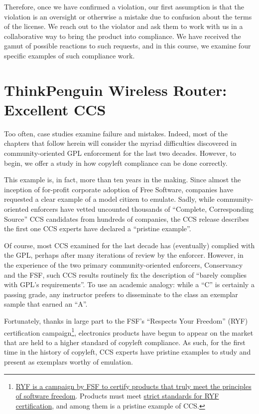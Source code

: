 Therefore, once we have confirmed a violation, our first assumption is
that the violation is an oversight or otherwise a mistake due to confusion
about the terms of the license. We reach out to the violator and ask them
to work with us in a collaborative way to bring the product into
compliance. We have received the gamut of possible reactions to such
requests, and in this course, we examine four specific examples of such
compliance work.

\chapter{ThinkPenguin Wireless Router: Excellent CCS}

Too often, case studies examine failure and mistakes.  Indeed, most of the
chapters that follow herein will consider the myriad difficulties discovered
in community-oriented GPL enforcement for the last two decades.  However, to
begin, we offer a study in how copyleft compliance can be done correctly.

This example is, in fact, more than ten years in the making.  Since almost
the inception of for-profit corporate adoption of Free Software, companies
have requested a clear example of a model citizen to emulate.  Sadly, while
community-oriented enforcers have vetted uncounted thousands of ``Complete,
Corresponding Source'' CCS candidates from hundreds of companies, the CCS
release describes the first one CCS experts have declared a ``pristine
example''.


Of course, most CCS examined for the last decade has (eventually) complied
with the GPL, perhaps after many iterations of review by the enforcer.
However, in the experience of the two primary community-oriented enforcers,
Conservancy and the FSF, such CCS results routinely fix the description of
``barely complies with GPL's requirements''.  To use an academic analogy:
while a ``C'' is certainly a passing grade, any instructor prefers to
disseminate to the class an exemplar sample that earned an ``A''.

Fortunately, thanks in large part to the FSF's
``Respects Your Freedom'' (RYF) certification campaign\footnote{\href{http://www.fsf.org/resources/hw/endorsement/respects-your-freedom}{RYF is
    a campaign by FSF to certify products that truly meet the principles of
    software freedom}.  Products must meet
  \href{http://www.fsf.org/resources/hw/endorsement/criteria}{strict
    standards for RYF certification}, and among them is a pristine example of
  CCS\@.}, electronics products have begun to appear on the market that are
held to a higher standard of copyleft compliance.  As such, for the first
time in the history of copyleft, CCS experts have pristine examples to study
and present as exemplars worthy of emulation.


